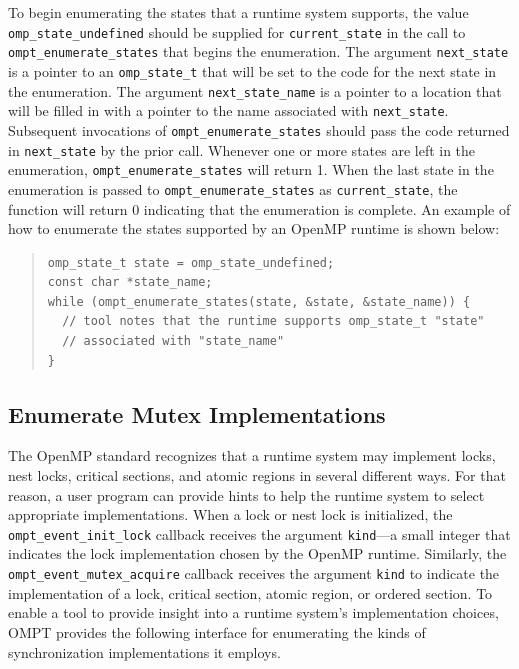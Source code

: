 \documentclass{article}
\begin{document}
\noindent
To begin enumerating the states that a runtime system supports,
the value \verb|omp_state_undefined| should be supplied for \verb|current_state| in the call to \verb|ompt_enumerate_states| that begins the enumeration.
The argument \verb|next_state| is a pointer to an \verb|omp_state_t| that will be set to the code for the next state in the enumeration.
The argument \verb|next_state_name| is a pointer to a location that will be filled in with a pointer to the name associated with \verb|next_state|. 
Subsequent invocations of \verb|ompt_enumerate_states| should pass the code returned in \verb|next_state| by the prior call.
Whenever one or more states are left in the enumeration, \verb|ompt_enumerate_states| will return 1.
When the last state in the enumeration is passed to \verb|ompt_enumerate_states| as \verb|current_state|, the function will return 0 indicating that the enumeration is complete.
An example of how to enumerate the states supported by an OpenMP runtime is shown below:

\begin{quote}
\begin{verbatim}
omp_state_t state = omp_state_undefined;
const char *state_name;
while (ompt_enumerate_states(state, &state, &state_name)) {
  // tool notes that the runtime supports omp_state_t "state" 
  // associated with "state_name" 
}
\end{verbatim}
\end{quote}

 \subsection{Enumerate Mutex Implementations}
 \label{ompt_enumerate_mutex_kinds}
 
The OpenMP standard recognizes that a runtime system may implement locks, nest locks, critical sections, and atomic regions in several different ways. For that reason, a user program can provide hints to help the runtime system to select appropriate implementations.
When a lock or nest lock is initialized, the \verb|ompt_event_init_lock| callback receives the argument \verb|kind|---a small integer that indicates the lock implementation chosen by the OpenMP runtime. Similarly,  the \verb|ompt_event_mutex_acquire| callback receives the argument \verb|kind| to indicate 
the implementation of a lock, critical section, atomic region, or ordered section. To enable a tool to provide insight into a runtime system's implementation choices, OMPT provides
the following interface for enumerating the kinds of synchronization implementations it employs.
\end{document}
